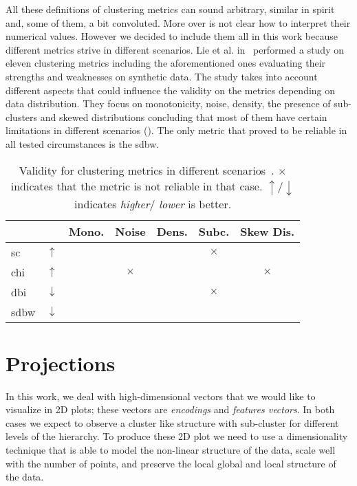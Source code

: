 All these definitions of clustering metrics can sound arbitrary, similar in spirit and, some of them, a bit convoluted. More over is not clear how to interpret their numerical values. However we decided to include them all in this work because different metrics strive in different scenarios. Lie et al. in~\cite{UnderstandingOLiuY2010} performed a study on eleven clustering metrics including the aforementioned ones evaluating their strengths and weaknesses on synthetic data. The study takes into account different aspects that could influence the validity on the metrics depending on data distribution. They focus on monotonicity, noise, density, the presence of sub-clusters and skewed distributions concluding that most of them have certain limitations in different scenarios (). The only metric that proved to be reliable in all tested circumstances is the \acrshort{sdbw}.
\begin{table}[h!]
  \renewcommand{\arraystretch}{1.2}%
  \centering
  \begin{tabular}{ |l l c c c c c| }
    \hline          &              & Mono. & Noise  & Dens. & Subc.  & Skew Dis. \\ \hline
    \acrshort{sc}   & $\uparrow  $ &       &        &       & $\times$ &           \\
    \acrshort{chi}  & $\uparrow  $ &       & $\times$ &       &        & $\times$    \\
    \acrshort{dbi}  & $\downarrow$ &       &        &       & $\times$ &           \\
    \acrshort{sdbw} & $\downarrow$ &       &        &       &        &           \\ \hline
  \end{tabular}
  \caption{Validity for clustering metrics in different scenarios~\cite{UnderstandingOLiuY2010}. $\times$ indicates that the metric is not reliable in that case. $\uparrow / \downarrow$ indicates \emph{higher}$/$ \emph{lower} is better.} \label{tab:clustering-metrics-study}
\end{table}

\section{Projections}
\label{sec:projections}

In this work, we deal with high-dimensional vectors that we would like to visualize in 2D plots; these vectors are \emph{encodings} and \emph{features vectors}.
In both cases we expect to observe a cluster like structure with sub-cluster for different levels of the hierarchy. To produce these 2D plot we need to use a dimensionality technique that is able to model the non-linear structure of the data, scale well with the number of points, and preserve the local global and local structure of the data.


